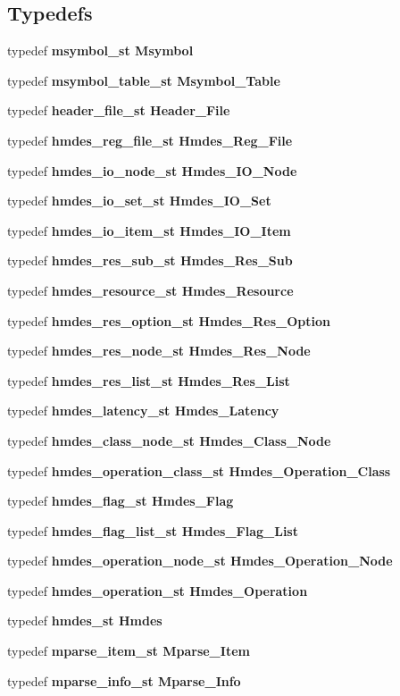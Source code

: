 \subsection*{Typedefs}
\begin{CompactItemize}
\item 
typedef \bf{msymbol\_\-st} \bf{Msymbol}
\item 
typedef \bf{msymbol\_\-table\_\-st} \bf{Msymbol\_\-Table}
\item 
typedef \bf{header\_\-file\_\-st} \bf{Header\_\-File}
\item 
typedef \bf{hmdes\_\-reg\_\-file\_\-st} \bf{Hmdes\_\-Reg\_\-File}
\item 
typedef \bf{hmdes\_\-io\_\-node\_\-st} \bf{Hmdes\_\-IO\_\-Node}
\item 
typedef \bf{hmdes\_\-io\_\-set\_\-st} \bf{Hmdes\_\-IO\_\-Set}
\item 
typedef \bf{hmdes\_\-io\_\-item\_\-st} \bf{Hmdes\_\-IO\_\-Item}
\item 
typedef \bf{hmdes\_\-res\_\-sub\_\-st} \bf{Hmdes\_\-Res\_\-Sub}
\item 
typedef \bf{hmdes\_\-resource\_\-st} \bf{Hmdes\_\-Resource}
\item 
typedef \bf{hmdes\_\-res\_\-option\_\-st} \bf{Hmdes\_\-Res\_\-Option}
\item 
typedef \bf{hmdes\_\-res\_\-node\_\-st} \bf{Hmdes\_\-Res\_\-Node}
\item 
typedef \bf{hmdes\_\-res\_\-list\_\-st} \bf{Hmdes\_\-Res\_\-List}
\item 
typedef \bf{hmdes\_\-latency\_\-st} \bf{Hmdes\_\-Latency}
\item 
typedef \bf{hmdes\_\-class\_\-node\_\-st} \bf{Hmdes\_\-Class\_\-Node}
\item 
typedef \bf{hmdes\_\-operation\_\-class\_\-st} \bf{Hmdes\_\-Operation\_\-Class}
\item 
typedef \bf{hmdes\_\-flag\_\-st} \bf{Hmdes\_\-Flag}
\item 
typedef \bf{hmdes\_\-flag\_\-list\_\-st} \bf{Hmdes\_\-Flag\_\-List}
\item 
typedef \bf{hmdes\_\-operation\_\-node\_\-st} \bf{Hmdes\_\-Operation\_\-Node}
\item 
typedef \bf{hmdes\_\-operation\_\-st} \bf{Hmdes\_\-Operation}
\item 
typedef \bf{hmdes\_\-st} \bf{Hmdes}
\item 
typedef \bf{mparse\_\-item\_\-st} \bf{Mparse\_\-Item}
\item 
typedef \bf{mparse\_\-info\_\-st} \bf{Mparse\_\-Info}
\end{CompactItemize}
